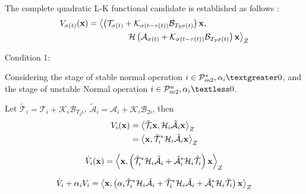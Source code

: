 \documentclass[twocolumn]{autart}    %
\begin{document}
\begin{pf}
    \\
    The complete quadratic L-K functional candidate is established as follows :
    \begin{equation}
        \begin{aligned}
            \setlength{\arraycolsep}{0.9pt}
            &V_{\sigma(t)}(\bold{x}) = \left \langle \left(\mathcal{T}_{\sigma(t)}+\mathcal{K}_{\sigma(t-\tau(t))}\mathcal{B}_{T_{2}\sigma(t)}\right)\bold{x}, \right. \\
            & \quad \quad \quad \quad \quad \quad \quad\left.\quad \mathcal{H}\left(\mathcal{A}_{\sigma(t)}+\mathcal{K}_{\sigma(t-\tau(t))}\mathcal{B}_{T_{2}\sigma(t)}\right)\bold{x} \right \rangle_{Z}
        \end{aligned}
    \end{equation}

    Condition 1: 

    Considering the stage of stable normal operation $i \in \mathcal{P}_{m2}^{s},\alpha_{i} \textgreater0$, and the stage of unstable Normal operation $i \in \mathcal{P}_{m2}^{u},\alpha_{i} \textless0$. 

    Let $\tilde{\mathcal{T}}_{i} = \mathcal{T}_{i}+\mathcal{K}_{i}\mathcal{B}_{T_{2}i}$, $\tilde{\mathcal{A}}_{i} = \mathcal{A}_{i}+\mathcal{K}_{i}\mathcal{B}_{2i}$, then
\begin{equation}
    \begin{aligned}
        \setlength{\arraycolsep}{0.9pt}
        V_{i}(\bold{x}) & = \left \langle \tilde{\mathcal{T}}_{i}\bold{x},\mathcal{H}_{i}\tilde{\mathcal{A}}_{i}\bold{x} \right \rangle_{Z}\\
    & = \left \langle \bold{x},\tilde{\mathcal{T}}_{i}^{*}\mathcal{H}_{i}\tilde{\mathcal{A}}_{i}\bold{x} \right \rangle_{Z}
    \end{aligned}
\end{equation}

\begin{equation}
    \begin{aligned}
        \setlength{\arraycolsep}{0.9pt}
        \dot{V}_{i}(\bold{x})  = \left \langle \bold{x},\left(\hat{\mathcal{T}}_{i}^{*}\mathcal{H}_{i}\hat{\mathcal{A}}_{i}+\hat{\mathcal{A}}_{i}^{*}\mathcal{H}_{i}\hat{\mathcal{T}}_{i}\right)\bold{x} \right \rangle_{Z}
    \end{aligned}
\end{equation}

\begin{equation}
    \begin{aligned}
        \setlength{\arraycolsep}{0.9pt}
        \dot{V}_{i}+\alpha_{i} V_{i}  = \left \langle \bold{x},\left(\alpha_{i}\tilde{\mathcal{T}}_{i}^{*}\mathcal{H}_{i}\tilde{\mathcal{A}}_{i}+\tilde{\mathcal{T}}_{i}^{*}\mathcal{H}_{i}\tilde{\mathcal{A}}_{i}+\tilde{\mathcal{A}}_{i}^{*}\mathcal{H}_{i}\tilde{\mathcal{T}}_{i}\right)\bold{x} \right \rangle_{Z}
\end{aligned}
\end{equation}



\end{pf}
\end{document}
